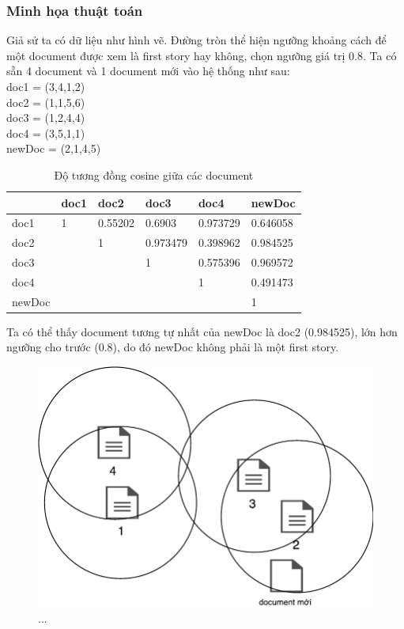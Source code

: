	\subsubsection{Minh họa thuật toán}
	Giả sử ta có dữ liệu như hình vẽ. Đường tròn thể hiện ngưỡng khoảng cách để một document được xem là first story hay không, chọn ngưỡng giá trị 0.8. Ta có sẵn 4 document và 1 document mới vào hệ thống như sau:\\
	doc1 = (3,4,1,2)\\
	doc2 = (1,1,5,6)\\
	doc3 = (1,2,4,4)\\
	doc4 = (3,5,1,1)\\
	newDoc = (2,1,4,5)\\
	\begin{table}[H]
		\centering
		\begin{tabular}{p{1.5cm}|p{1.5cm}|p{1.5cm}|p{1.5cm}|p{1.5cm}|p{1.5cm}}
			\hline
			& doc1 & doc2 & doc3 & doc4 & \textbf{newDoc} \\
			\hline 
			doc1 & 1 & 0.55202 & 0.6903 	& 0.973729 & 0.646058 \\
			doc2 &   & 1 		& 0.973479 	& 0.398962 & 0.984525 \\
			doc3 &   &   		& 1			& 0.575396 & 0.969572 \\
			doc4 &   &  		&  			& 1 	& 0.491473 \\
			newDoc &   &  		&  			&   	& 1 \\
			\hline
		\end{tabular}
		\caption{Độ tương đồng cosine giữa các document} \label{tab:table_1_1}
	
	\end{table}
	Ta có thể thấy document tương tự nhất của newDoc là doc2 (0.984525), lớn hơn ngưỡng cho trước (0.8), do đó newDoc không phải là một first story.

	\begin{figure}[H]
		\begin{center}
			\includegraphics[]{NNS.pdf}
			\caption{...}
		\end{center}
	\end{figure}
	

